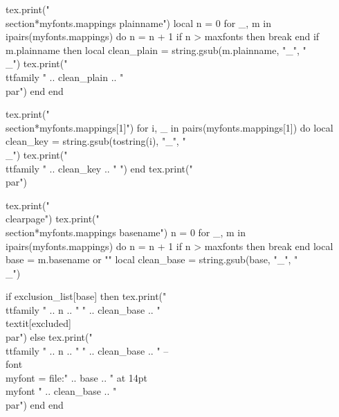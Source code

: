 \documentclass{article}
\begin{document}
\begin{luacode*}
  tex.print("\\section*{myfonts.mappings plainname}")
  local n = 0
  for _, m in ipairs(myfonts.mappings) do
    n = n + 1
    if n > maxfonts then break end
    if m.plainname then
      local clean_plain = string.gsub(m.plainname, "_", "\\_")
      tex.print("\\ttfamily " .. clean_plain .. "\\par")
    end
  end

  tex.print("\\section*{myfonts.mappings[1]}")
  for i, _ in pairs(myfonts.mappings[1]) do
    local clean_key = string.gsub(tostring(i), "_", "\\_")
    tex.print("\\ttfamily " .. clean_key .. " ")
  end
  tex.print("\\par")

  tex.print("\\clearpage")
  tex.print("\\section*{myfonts.mappings basename}")
  n = 0
  for _, m in ipairs(myfonts.mappings) do
    n = n + 1
    if n > maxfonts then break end
    local base = m.basename or ""
    local clean_base = string.gsub(base, "_", "\\_")

    if exclusion_list[base] then
      tex.print("\\ttfamily " .. n .. " " .. clean_base .. " \\textit{[excluded]}\\par")
    else
      tex.print("\\ttfamily " .. n .. " " .. clean_base .. " -- {\\font\\myfont = {file:" .. base .. "} at 14pt \\myfont " .. clean_base .. "}\\par")
    end
  end
\end{luacode*}
\end{document}

